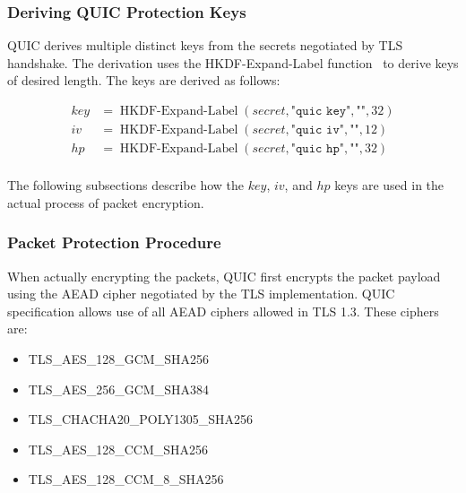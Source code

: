 \subsubsection{Deriving QUIC Protection Keys}\label{sec:02-encryption-key-derivation}

QUIC derives multiple distinct keys from the secrets negotiated by TLS handshake. The derivation
uses the HKDF-Expand-Label function~\cite{rfc5869} to derive keys of desired length. The keys are
derived as follows:

\begin{equation*}
  \begin{split}
  key & = \operatorname{HKDF-Expand-Label}(secret, \texttt{"quic key"}, \texttt{""}, 32) \\
  iv  & = \operatorname{HKDF-Expand-Label}(secret, \texttt{"quic iv"}, \texttt{""}, 12)  \\
  hp  & = \operatorname{HKDF-Expand-Label}(secret, \texttt{"quic hp"}, \texttt{""}, 32)  \\
  \end{split}
\end{equation*}

The following subsections describe how the $key$, $iv$, and $hp$ keys are used in the actual process
of packet encryption.

\subsubsection{Packet Protection Procedure}

When actually encrypting the packets, QUIC first encrypts the packet payload using the AEAD cipher
negotiated by the TLS implementation. QUIC specification allows use of all AEAD ciphers allowed in
TLS 1.3. These ciphers are:

\begin{itemize}

  \item TLS\_AES\_128\_GCM\_SHA256

  \item TLS\_AES\_256\_GCM\_SHA384

  \item TLS\_CHACHA20\_POLY1305\_SHA256

  \item TLS\_AES\_128\_CCM\_SHA256

  \item TLS\_AES\_128\_CCM\_8\_SHA256

\end{itemize}



